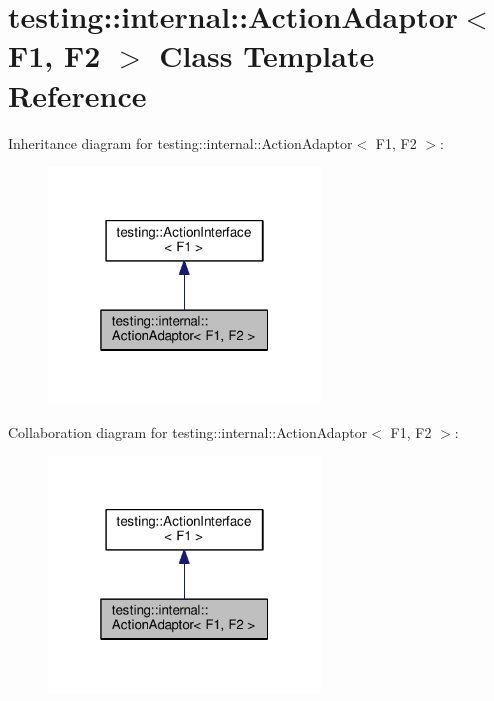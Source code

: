 \hypertarget{classtesting_1_1internal_1_1_action_adaptor}{}\section{testing\+:\+:internal\+:\+:Action\+Adaptor$<$ F1, F2 $>$ Class Template Reference}
\label{classtesting_1_1internal_1_1_action_adaptor}


Inheritance diagram for testing\+:\+:internal\+:\+:Action\+Adaptor$<$ F1, F2 $>$\+:
\nopagebreak
\begin{figure}[H]
\begin{center}
\leavevmode
\includegraphics[width=205pt]{classtesting_1_1internal_1_1_action_adaptor__inherit__graph}
\end{center}
\end{figure}


Collaboration diagram for testing\+:\+:internal\+:\+:Action\+Adaptor$<$ F1, F2 $>$\+:
\nopagebreak
\begin{figure}[H]
\begin{center}
\leavevmode
\includegraphics[width=205pt]{classtesting_1_1internal_1_1_action_adaptor__coll__graph}
\end{center}
\end{figure}

